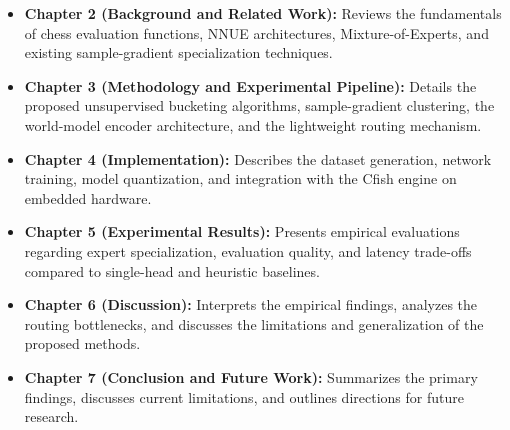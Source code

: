 \begin{itemize}
	\item \textbf{Chapter 2 (Background and Related Work):} Reviews the fundamentals of chess evaluation functions, NNUE architectures, Mixture-of-Experts, and existing sample-gradient specialization techniques.
	\item \textbf{Chapter 3 (Methodology and Experimental Pipeline):} Details the proposed unsupervised bucketing algorithms, sample-gradient clustering, the world-model encoder architecture, and the lightweight routing mechanism.
	\item \textbf{Chapter 4 (Implementation):} Describes the dataset generation, network training, model quantization, and integration with the Cfish engine on embedded hardware.
	\item \textbf{Chapter 5 (Experimental Results):} Presents empirical evaluations regarding expert specialization, evaluation quality, and latency trade-offs compared to single-head and heuristic baselines.
	\item \textbf{Chapter 6 (Discussion):} Interprets the empirical findings, analyzes the routing bottlenecks, and discusses the limitations and generalization of the proposed methods.
	\item \textbf{Chapter 7 (Conclusion and Future Work):} Summarizes the primary findings, discusses current limitations, and outlines directions for future research.
\end{itemize}
